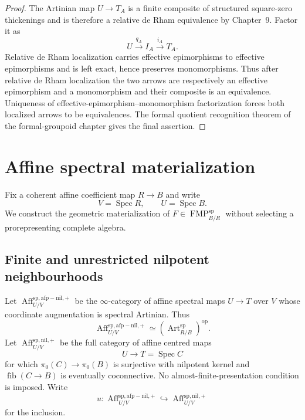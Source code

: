 \begin{proof}
The Artinian map $U\to T_A$ is a finite composite of structured square-zero
thickenings and is therefore a relative de Rham equivalence by Chapter~9.
Factor it as
\[
    U\xrightarrow{q_A}I_A\xrightarrow{i_A}T_A.
\]
Relative de Rham localization carries effective epimorphisms to effective
epimorphisms and is left exact, hence preserves monomorphisms.  Thus after
relative de Rham localization the two arrows are respectively an effective
epimorphism and a monomorphism and their composite is an equivalence.
Uniqueness of effective-epimorphism--monomorphism factorization forces both
localized arrows to be equivalences.  The formal quotient recognition theorem
of the formal-groupoid chapter gives the final assertion.
\end{proof}

\section{Affine spectral materialization}
\label{sec:bnli-affine-materialization}

Fix a coherent affine coefficient map $R\to B$ and write
\[
    V=\operatorname{Spec}R,
    \qquad
    U=\operatorname{Spec}B.
\]
We construct the geometric materialization of
$F\in\operatorname{FMP}^{\mathrm{sp}}_{B/R}$ without selecting a
prorepresenting complete algebra.

\subsection{Finite and unrestricted nilpotent neighbourhoods}

\begin{definition}
\label{def:bnli-nil-neighbourhoods}
Let
$\operatorname{Aff}^{\mathrm{sp,afp-nil,+}}_{U/V}$ be the $\infty$-category of
affine spectral maps $U\to T$ over $V$ whose coordinate augmentation is
spectral Artinian.  Thus
\[
    \operatorname{Aff}^{\mathrm{sp,afp-nil,+}}_{U/V}
    \simeq
    \left(\operatorname{Art}^{\mathrm{sp}}_{R/B}\right)^{\mathrm{op}}.
\]
Let $\operatorname{Aff}^{\mathrm{sp,nil,+}}_{U/V}$ be the full category of
affine centred maps
\[
    U\longrightarrow T=\operatorname{Spec}C
\]
for which $\pi_0(C)\to\pi_0(B)$ is surjective with nilpotent kernel and
$\operatorname{fib}(C\to B)$ is eventually coconnective.  No
almost-finite-presentation condition is imposed.  Write
\[
    u:
    \operatorname{Aff}^{\mathrm{sp,afp-nil,+}}_{U/V}
    \hookrightarrow
    \operatorname{Aff}^{\mathrm{sp,nil,+}}_{U/V}
\]
for the inclusion.
\end{definition}

